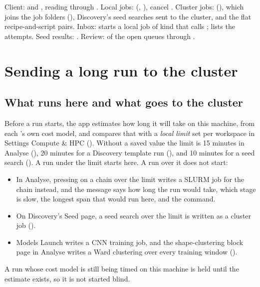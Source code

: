 \begin{underthehood}
Client:  and , reading through
. Local jobs: 
(, ), cancel . Cluster jobs: 
(), which joins the job folders
(), Discovery's seed searches sent to the cluster,
and the flat recipe-and-script pairs. Inbox:  starts a local job of
kind  that calls ;  lists the attempts. Seed results: . Review:
 of the open queues through .
\end{underthehood}

\section{Sending a long run to the cluster}\label{sec:jobs-sending}
\subsection{What runs here and what goes to the cluster}
Before a run starts, the app estimates how long it will take on this machine, from each
's own cost model, and compares that with a \emph{local limit} set per workspace
in Settings \textrightarrow{} Compute \& HPC (). Without a saved
value the limit is 15 minutes in Analyse (), 20 minutes for a
Discovery template run (), and 10 minutes for a seed search
(). A run under the limit starts here. A run over it does not start:
\begin{itemize}
\item In Analyse, pressing  on a chain over the limit writes a SLURM job for the chain
  instead, and the message says how long the run would take, which stage is slow, the longest span
  that would run here, and the  command.
\item On Discovery's Seed page, a seed search over the limit is written as a cluster job
  ().
\item Models \textrightarrow{} Launch writes a CNN training job, and the shape-clustering block page in
  Analyse writes a Ward clustering over every training window
  ().
\end{itemize}
A run whose cost model is still being timed on this machine is held until the estimate exists, so it
is not started blind.

